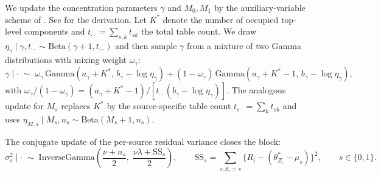 We update the concentration parameters $\gamma$ and $M_0, M_1$ by the auxiliary-variable scheme of \citet{escobar1995bayesian}. See \citet[Appendix A]{teh2006hierarchical} for the derivation.
Let $K^*$ denote the number of occupied top-level components and $t_{\cdot\cdot} = \sum_{s, k} t_{sk}$ the total table count.
We draw $\eta_\gamma \mid \gamma, t_{\cdot\cdot} \sim \mathrm{Beta}(\gamma + 1, t_{\cdot\cdot})$ and then sample $\gamma$ from a mixture of two Gamma distributions with mixing weight $\omega_\gamma$:
\begin{equation}
\gamma \mid \cdot \;\sim\; \omega_\gamma\, \mathrm{Gamma}(a_\gamma + K^*,\, b_\gamma - \log \eta_\gamma) + (1 - \omega_\gamma)\, \mathrm{Gamma}(a_\gamma + K^* - 1,\, b_\gamma - \log \eta_\gamma),
\end{equation}
with $\omega_\gamma / (1 - \omega_\gamma) = (a_\gamma + K^* - 1) / [t_{\cdot\cdot}(b_\gamma - \log \eta_\gamma)]$.
The analogous update for $M_s$ replaces $K^*$ by the source-specific table count $t_{s\cdot} = \sum_k t_{sk}$ and uses $\eta_{M, s} \mid M_s, n_s \sim \mathrm{Beta}(M_s + 1, n_s)$.

The conjugate update of the per-source residual variance closes the block:
\begin{equation}
\sigma_s^2 \mid \cdot \;\sim\; \mathrm{InverseGamma}\!\left(\frac{\nu + n_s}{2},\; \frac{\nu \lambda + \mathrm{SS}_s}{2}\right), \qquad \mathrm{SS}_s = \sum_{i : S_i = s} \bigl\{R_i - (\theta_{Z_i}^* - \mu_s)\bigr\}^2, \qquad s \in \{0, 1\}.
\label{eq:sm-sigma}
\end{equation}

